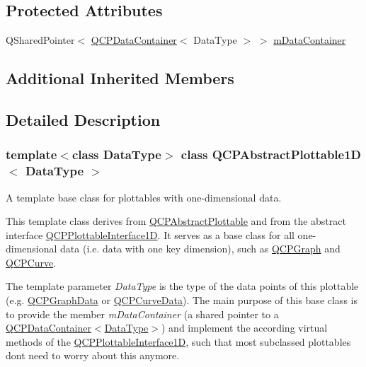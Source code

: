 \subsection*{Protected Attributes}
\begin{DoxyCompactItemize}
\item 
Q\+Shared\+Pointer$<$ \mbox{\hyperlink{class_q_c_p_data_container}{Q\+C\+P\+Data\+Container}}$<$ Data\+Type $>$ $>$ \mbox{\hyperlink{class_q_c_p_abstract_plottable1_d_ac139cf70590707a1fb40eabe97fac246}{m\+Data\+Container}}
\end{DoxyCompactItemize}
\subsection*{Additional Inherited Members}


\subsection{Detailed Description}
\subsubsection*{template$<$class Data\+Type$>$\newline
class Q\+C\+P\+Abstract\+Plottable1\+D$<$ Data\+Type $>$}

A template base class for plottables with one-\/dimensional data. 

This template class derives from \mbox{\hyperlink{class_q_c_p_abstract_plottable}{Q\+C\+P\+Abstract\+Plottable}} and from the abstract interface \mbox{\hyperlink{class_q_c_p_plottable_interface1_d}{Q\+C\+P\+Plottable\+Interface1D}}. It serves as a base class for all one-\/dimensional data (i.\+e. data with one key dimension), such as \mbox{\hyperlink{class_q_c_p_graph}{Q\+C\+P\+Graph}} and \mbox{\hyperlink{class_q_c_p_curve}{Q\+C\+P\+Curve}}.

The template parameter {\itshape Data\+Type} is the type of the data points of this plottable (e.\+g. \mbox{\hyperlink{class_q_c_p_graph_data}{Q\+C\+P\+Graph\+Data}} or \mbox{\hyperlink{class_q_c_p_curve_data}{Q\+C\+P\+Curve\+Data}}). The main purpose of this base class is to provide the member {\itshape m\+Data\+Container} (a shared pointer to a \mbox{\hyperlink{class_q_c_p_data_container}{Q\+C\+P\+Data\+Container$<$Data\+Type$>$}}) and implement the according virtual methods of the \mbox{\hyperlink{class_q_c_p_plottable_interface1_d}{Q\+C\+P\+Plottable\+Interface1D}}, such that most subclassed plottables don\textquotesingle{}t need to worry about this anymore.

